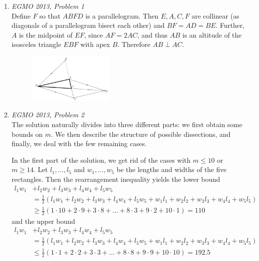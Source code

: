 \documentclass[11pt]{article}
\begin{document}
\begin{enumerate}
    \item \textit{EGMO 2013, Problem 1} \\
    Define $F$ so that $ABFD$ is a parallelogram. Then $E, A, C, F$ are collinear (as diagonals of a parallelogram bisect each other) and $BF = AD = BE$. Further, $A$ is the midpoint of $EF$, since $AF = 2AC$, and thus $AB$ is an altitude of the isosceles triangle $EBF$ with apex $B$. Therefore $AB \perp AC$.
    
    \begin{figure}[h!]
        \centering
        \includegraphics[width=0.4\textwidth]{seniortest1_q1.PNG}
    \end{figure}
    
    \item \textit{EGMO 2013, Problem 2} \\
    The solution naturally divides into three different parts: we first obtain some bounds on $m$. We then describe the structure of possible dissections, and finally, we deal with the few remaining cases.
    
    In the first part of the solution, we get rid of the cases with $m \leq 10$ or $m \geq 14$. Let $l_1, \dots, l_5$  and $w_1, \dots, w_5$ be the lengths and widths of the five rectangles. Then the rearrangement inequality yields the lower bound
    \begin{align*}
        l_1 w_1 &+ l_2 w_2 + l_3 w_3 + l_4 w_4 + l_5 w_5 \\
        &= \frac{1}{2} \left( l_1 w_1 + l_2 w_2 + l_3 w_3 + l_4 w_4 + l_5 w_5 + w_1 l_1 + w_2 l_2 + w_3 l_3 + w_4 l_4 + w_5 l_5 \right) \\
        &\geq \frac{1}{2} \left( 1 \cdot 10 + 2 \cdot 9 + 3 \cdot 8 + \dots + 8 \cdot 3 + 9 \cdot 2 + 10 \cdot 1 \right) = 110
    \end{align*}
and the upper bound
    \begin{align*}
        l_1 w_1 &+ l_2 w_2 + l_3 w_3 + l_4 w_4 + l_5 w_5 \\
        &= \frac{1}{2} \left( l_1 w_1 + l_2 w_2 + l_3 w_3 + l_4 w_4 + l_5 w_5 + w_1 l_1 + w_2 l_2 + w_3 l_3 + w_4 l_4 + w_5 l_5 \right) \\
        &\leq \frac{1}{2} \left( 1 \cdot 1 + 2 \cdot 2 + 3 \cdot 3 + \dots + 8 \cdot 8 + 9 \cdot 9 + 10 \cdot 10 \right) = 192.5
    \end{align*}



\end{enumerate}
\end{document}
